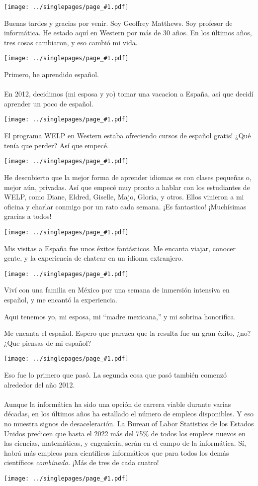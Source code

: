 \documentclass[12pt]{article}
\newcommand{\cue}{\mbox{}\\
  \fbox{\sf Next slide}
\\}
\newcommand{\fig}[1]{
  \newpage  
  \begin{center}
    \texttt{[image: ../singlepages/page\_\#1.pdf]}
  \end{center}
  
}
\begin{document}
\Large


\fig{1}
Buenas tardes y gracias por venir.  Soy Geoffrey Matthews. Soy
profesor de informática. He estado aquí en Western por más de 30 años.
En los últimos años, tres cosas cambiaron, y eso cambió mi vida.

\fig{3}

Primero, he aprendido español.  \cue En 2012, decidimos (mi esposa y
yo) tomar una vacacion a España, así que decidí aprender un poco de
español.

\fig{4}

El programa WELP en Western estaba ofreciendo cursos de
español gratis!  ¿Qué tenía que perder?  Así que empecé.

\fig{5}

He descubierto que la mejor forma de aprender idiomas es con clases
pequeñas o, mejor aún, privadas.  Así que empecé muy pronto a hablar
con los estudiantes de WELP, como Diane, Eldred, Giselle, Majo,
Gloria, y otros.  Ellos vinieron a mi oficina y charlar conmigo por un
rato cada semana.  ¡Es fantastico! ¡Muchísimas gracias a todos!

\fig{6}

Mis visitas a España fue unos éxitos fantásticos.  Me encanta viajar,
conocer gente, y la experiencia de chatear en un idioma extranjero.

\fig{7}

Viví con una familia en México por una semana de inmersión intensiva
en español, y me encantó la experiencia.

Aqui tenemos yo, mi esposa, mi ``madre mexicana,'' y mi sobrina
honorifica.  

Me encanta el español.  Espero que parezca que la resulta fue un gran
éxito, ¿no?  ¿Que piensas de mi español?


\fig{9}

Eso fue lo primero que pasó.  La segunda cosa que pasó también comenzó
alrededor del año 2012.  \cue Aunque la informática ha sido una opción
de carrera viable durante varias décadas, en los últimos años ha
estallado el número de empleos disponibles.  Y eso no muestra signos
de desaceleración.  La Bureau of Labor Statistics de los Estados
Unidos predicen que hasta el 2022 más del 75\% de todos los empleos
nuevos en las ciencias, matemáticas, y engeniería, serán en el campo
de la informática.  Sí, habrá más empleos para científicos
informáticos que para todos los demás científicos {\em combinado.}
¡Más de tres de cada cuatro!

\fig{10}
\end{document}
